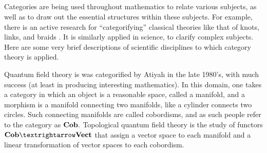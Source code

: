 \documentclass[../main/CT4S-EN-RU]{subfiles}
\begin{document}
\begin{blockRUS}
\end{blockRUS}


\subsection{} 

\begin{blockENG}
Categories are being used throughout mathematics to relate various subjects, as well as to draw out the essential structures within these subjects. For example, there is an active research for “categorifying” classical theories like that of knots, links, and braids \cite{Kho}. It is similarly applied in science, to clarify complex subjects. Here are some very brief descriptions of scientific disciplines to which category theory is applied.
\end{blockENG}

\begin{blockRUS}
\end{blockRUS}

\begin{blockENG}
Quantum field theory is was categorified by Atiyah \cite{Ati} in the late 1980's, with much success (at least in producing interesting mathematics). In this domain, one takes a category in which an object is a reasonable space, called a manifold, and a morphism is a manifold connecting two manifolds, like a cylinder connects two circles. Such connecting manifolds are called cobordisms, and as such people refer to the category as ${\mathbf{Cob}}.$ Topological quantum field theory is the study of functors $\Cob{→}\Vect$ that assign a vector space to each manifold and a linear transformation of vector spaces to each cobordism. 
\end{blockENG}

\begin{blockRUS}
\end{blockRUS}
\end{document}
